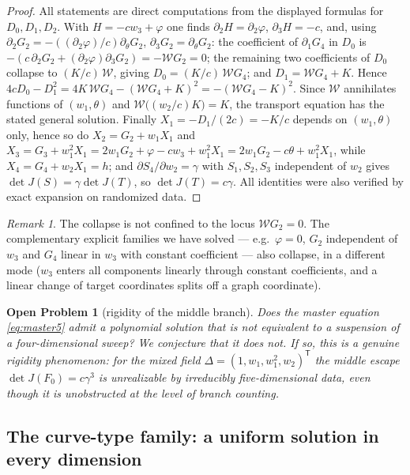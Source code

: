 \documentclass[11pt]{article}
\theoremstyle{plain}
\newtheorem{problem}[theorem]{Open Problem}
\theoremstyle{definition}
\theoremstyle{remark}
\newtheorem{remark}[theorem]{Remark}
\begin{document}
\begin{proof}
All statements are direct computations from the displayed formulas for
$D_0,D_1,D_2$. With $H=-cw_3+\varphi$ one finds
$\partial_2H=\partial_2\varphi$, $\partial_3H=-c$, and, using
$\partial_2G_2=-((\partial_2\varphi)/c)\partial_\theta G_2$,
$\partial_3G_2=\partial_\theta G_2$:
the coefficient of $\partial_1G_4$ in $D_0$ is
$-(c\,\partial_2G_2+(\partial_2\varphi)\partial_3G_2)=-\mathcal WG_2=0$; the remaining
two coefficients of $D_0$ collapse to $(K/c)\,\mathcal W$, giving
$D_0=(K/c)\,\mathcal WG_4$; and $D_1=\mathcal WG_4+K$. Hence
$4cD_0-D_1^2=4K\,\mathcal WG_4-(\mathcal WG_4+K)^2=-(\mathcal WG_4-K)^2$.
Since $\mathcal W$ annihilates functions of $(w_1,\theta)$ and
$\mathcal W\bigl((w_2/c)K\bigr)=K$, the transport equation has the stated general
solution. Finally $X_1=-D_1/(2c)=-K/c$ depends on $(w_1,\theta)$ only, hence so
do $X_2=G_2+w_1X_1$ and
$X_3=G_3+w_1^2X_1=2w_1G_2+\varphi-cw_3+w_1^2X_1=2w_1G_2-c\theta+w_1^2X_1$, while
$X_4=G_4+w_2X_1=h$; and $\partial S_4/\partial w_2=\gamma$ with
$S_1,S_2,S_3$ independent of $w_2$ gives $\det J(S)=\gamma\det J(T)$, so
$\det J(T)=c\gamma$. All identities were also verified by exact expansion on
randomized data.
\end{proof}

\begin{remark}
The collapse is not confined to the locus $\mathcal WG_2=0$. The
complementary explicit families we have solved --- e.g.\ $\varphi=0$,
$G_2$ independent of $w_3$ and $G_4$ linear in $w_3$ with constant coefficient ---
also collapse, in a different mode ($w_3$ enters all components linearly through
constant coefficients, and a linear change of target coordinates splits off a
graph coordinate).
\end{remark}

\begin{problem}[rigidity of the middle branch]\label{prob:rigid5}
Does the master equation \eqref{eq:master5} admit a polynomial solution that is
not equivalent to a suspension of a four-dimensional sweep? We conjecture that
it does not. If so, this is a genuine rigidity phenomenon: for the mixed field
$\Delta=(1,w_1,w_1^2,w_2)^{\mathsf T}$ the middle escape $\det J(F_0)=c\gamma^3$ is
unrealizable by irreducibly five-dimensional data, even though it is
unobstructed at the level of branch counting.
\end{problem}

\subsection{The curve-type family: a uniform solution in every dimension}
\label{subsec:curvefam}
\end{document}
